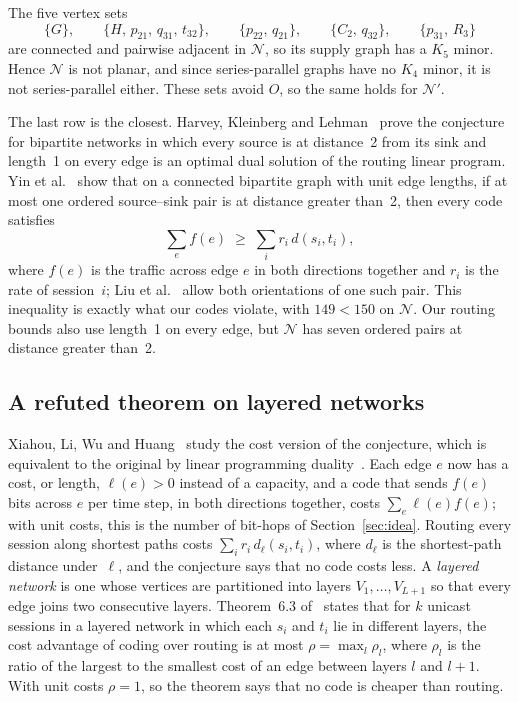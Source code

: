 \documentclass[11pt]{article}
\begin{document}
The five vertex sets
\[
\{G\},\qquad\{H,\,p_{21},\,q_{31},\,t_{32}\},\qquad\{p_{22},\,q_{21}\},\qquad\{C_2,\,q_{32}\},\qquad\{p_{31},\,R_3\}
\]
are connected and pairwise adjacent in $\mathcal N$, so its supply graph has a $K_5$ minor. Hence $\mathcal N$ is not planar, and since series-parallel graphs have no $K_4$ minor, it is not series-parallel either. These sets avoid $O$, so the same holds for $\mathcal N'$.

The last row is the closest. Harvey, Kleinberg and Lehman~\cite{HKL06} prove the conjecture for bipartite networks in which every source is at distance~2 from its sink and length~1 on every edge is an optimal dual solution of the routing linear program. Yin et al.~\cite[Corollary~1]{YLLW18} show that on a connected bipartite graph with unit edge lengths, if at most one ordered source--sink pair is at distance greater than~2, then every code satisfies
\[
\sum_e f(e)\;\ge\;\sum_i r_i\,d(s_i,t_i),
\]
where $f(e)$ is the traffic across edge $e$ in both directions together and $r_i$ is the rate of session~$i$; Liu et al.~\cite[Lemma~1]{LQLL26} allow both orientations of one such pair. This inequality is exactly what our codes violate, with $149<150$ on $\mathcal N$. Our routing bounds also use length~1 on every edge, but $\mathcal N$ has seven ordered pairs at distance greater than~2.

\subsection{A refuted theorem on layered networks}\label{sec:layered}

Xiahou, Li, Wu and Huang~\cite{XLWH14} study the cost version of the conjecture, which is equivalent to the original by linear programming duality~\cite[Theorem~4.1]{XLWH14}. Each edge $e$ now has a cost, or length, $\ell(e)>0$ instead of a capacity, and a code that sends $f(e)$ bits across $e$ per time step, in both directions together, costs $\sum_e \ell(e)f(e)$; with unit costs, this is the number of bit-hops of Section~\ref{sec:idea}. Routing every session along shortest paths costs $\sum_i r_i\,d_\ell(s_i,t_i)$, where $d_\ell$ is the shortest-path distance under~$\ell$, and the conjecture says that no code costs less. A \emph{layered network} is one whose vertices are partitioned into layers $V_1,\dots,V_{L+1}$ so that every edge joins two consecutive layers. Theorem~6.3 of~\cite{XLWH14} states that for $k$ unicast sessions in a layered network in which each $s_i$ and $t_i$ lie in different layers, the cost advantage of coding over routing is at most $\rho=\max_l\rho_l$, where $\rho_l$ is the ratio of the largest to the smallest cost of an edge between layers $l$ and $l+1$. With unit costs $\rho=1$, so the theorem says that no code is cheaper than routing.
\end{document}
